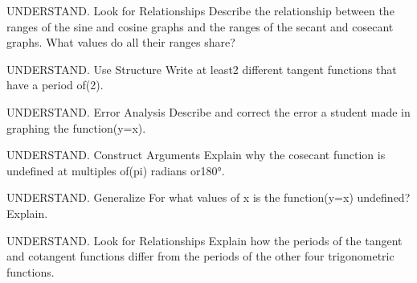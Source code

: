 \documentclass{article}
\newenvironment{practice}[2]{}{}        %
\newcommand{\answer}[1]{}               %
\newcommand{\placeholder}[2]{}          %
\begin{document}
\begin{practice}{6}{2}
UNDERSTAND. Look for Relationships Describe the relationship between the ranges of the sine and cosine graphs and the ranges of the secant and cosecant graphs. What values do all their ranges share?
\answer{The range of sine and cosine is all real numbers from-1 to1, inclusive; the range of cosecant and secant is all real numbers(\geq1) or(\leq-1). The values they all share are(\pm1).}
\end{practice}
\begin{practice}{7}{2}
UNDERSTAND. Use Structure Write at least2 different tangent functions that have a period of(2\pi).
\answer{(y=\tan(\frac12 x)) or(y=\tan(-\frac12 x))}
\end{practice}
\begin{practice}{8}{2}
UNDERSTAND. Error Analysis Describe and correct the error a student made in graphing the function(y=\sec x).
\placeholder{graph}{Student error red sec x+1 on pale-blue squared paper with curled corner and redX; x,y doublearrowaxes,O; xgridpi/4 labels-pi,-pi/2,pi/2,pi;ygrid1 labels-4,-2,2,4;window-5pi/4..5pi/4,-5..5. Central upbranch minimum(0,2),downbranches max(+-pi,0),asymptotes+-pi/2 implied,end arrows.}
\answer{The graph has been shifted up one unit. This is the correct graph for(y=\sec x):}
\placeholder{graph}{Correct red sec x,arrowed x,y axes,O; xgridpi/4 labels-pi/2,pi/2;ygrid1 labels-4,-2,2,4;window-pi..pi,-5..5. Central upbranch min(0,1),downbranch tops at(+-pi,-1),asymptotes+-pi/2 implied,end arrows.}
\end{practice}
\begin{practice}{9}{2}
UNDERSTAND. Construct Arguments Explain why the cosecant function is undefined at multiples of(pi) radians or180°.
\answer{That is where its reciprocal function, sine, is0.}
\end{practice}
\begin{practice}{10}{2}
UNDERSTAND. Generalize For what values of x is the function(y=\tan x) undefined? Explain.
\answer{The function for(y=\tan x) is undefined at all the odd integer multiples of(pi/2) or90°.}
\end{practice}
\begin{practice}{11}{2}
UNDERSTAND. Look for Relationships Explain how the periods of the tangent and cotangent functions differ from the periods of the other four trigonometric functions.
\answer{The period for the tangent and cotangent functions is(pi), whereas the other four trigonometric functions have a period of(2\pi).}
\end{practice}
\end{document}

